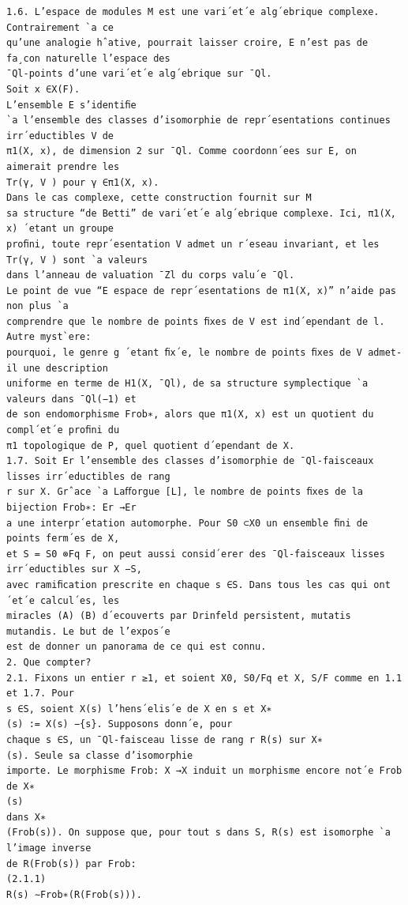 \documentclass[11pt]{article}
\begin{document}
\begin{Verbatim}[breaklines=true,fontsize=\small]
1.6. L’espace de modules M est une vari´et´e alg´ebrique complexe. Contrairement `a ce
qu’une analogie hˆative, pourrait laisser croire, E n’est pas de fa¸con naturelle l’espace des
¯Ql-points d’une vari´et´e alg´ebrique sur ¯Ql.
Soit x ∈X(F).
L’ensemble E s’identiﬁe
`a l’ensemble des classes d’isomorphie de repr´esentations continues irr´eductibles V de
π1(X, x), de dimension 2 sur ¯Ql. Comme coordonn´ees sur E, on aimerait prendre les
Tr(γ, V ) pour γ ∈π1(X, x).
Dans le cas complexe, cette construction fournit sur M
sa structure “de Betti” de vari´et´e alg´ebrique complexe. Ici, π1(X, x) ´etant un groupe
proﬁni, toute repr´esentation V admet un r´eseau invariant, et les Tr(γ, V ) sont `a valeurs
dans l’anneau de valuation ¯Zl du corps valu´e ¯Ql.
Le point de vue “E espace de repr´esentations de π1(X, x)” n’aide pas non plus `a
comprendre que le nombre de points ﬁxes de V est ind´ependant de l. Autre myst`ere:
pourquoi, le genre g ´etant ﬁx´e, le nombre de points ﬁxes de V admet-il une description
uniforme en terme de H1(X, ¯Ql), de sa structure symplectique `a valeurs dans ¯Ql(−1) et
de son endomorphisme Frob∗, alors que π1(X, x) est un quotient du compl´et´e proﬁni du
π1 topologique de P, quel quotient d´ependant de X.
1.7. Soit Er l’ensemble des classes d’isomorphie de ¯Ql-faisceaux lisses irr´eductibles de rang
r sur X. Grˆace `a Laﬀorgue [L], le nombre de points ﬁxes de la bijection Frob∗: Er →Er
a une interpr´etation automorphe. Pour S0 ⊂X0 un ensemble ﬁni de points ferm´es de X,
et S = S0 ⊗Fq F, on peut aussi consid´erer des ¯Ql-faisceaux lisses irr´eductibles sur X −S,
avec ramiﬁcation prescrite en chaque s ∈S. Dans tous les cas qui ont ´et´e calcul´es, les
miracles (A) (B) d´ecouverts par Drinfeld persistent, mutatis mutandis. Le but de l’expos´e
est de donner un panorama de ce qui est connu.
2. Que compter?
2.1. Fixons un entier r ≥1, et soient X0, S0/Fq et X, S/F comme en 1.1 et 1.7. Pour
s ∈S, soient X(s) l’hens´elis´e de X en s et X∗
(s) := X(s) −{s}. Supposons donn´e, pour
chaque s ∈S, un ¯Ql-faisceau lisse de rang r R(s) sur X∗
(s). Seule sa classe d’isomorphie
importe. Le morphisme Frob: X →X induit un morphisme encore not´e Frob de X∗
(s)
dans X∗
(Frob(s)). On suppose que, pour tout s dans S, R(s) est isomorphe `a l’image inverse
de R(Frob(s)) par Frob:
(2.1.1)
R(s) ∼Frob∗(R(Frob(s))).


\end{Verbatim}
\end{document}
